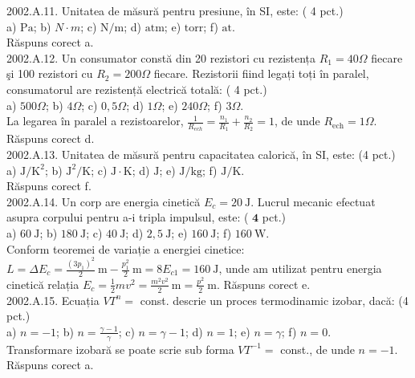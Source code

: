 2002.A.11. Unitatea de măsură pentru presiune, în SI, este: ( 4 pct.)\\ a) $\mathrm{Pa}$; b) $N \cdot m$; c) $\mathrm{N} / \mathrm{m}$; d) $\mathrm{atm}$; e) $\mathrm{torr}$; f) $\mathrm{at}$.\\ Răspuns corect a.\\

2002.A.12. Un consumator constă din 20 rezistori cu rezistența $R_{1}=40 \Omega$ fiecare şi 100 rezistori cu $R_{2}=200 \Omega$ fiecare. Rezistorii fiind legați toți în paralel, consumatorul are rezistență electrică totală: ( 4 pct.)\\ a) $500 \Omega$; b) $4 \Omega$; c) $0,5 \Omega$; d) $1 \Omega$; e) $240 \Omega$; f) $3 \Omega$.\\ La legarea în paralel a rezistoarelor, $\frac{1}{R_{ech}}=\frac{n_{1}}{R_{1}}+\frac{n_{2}}{R_{2}}=1$, de unde $R_{\text {ech}}=1 \Omega$. Răspuns corect d.\\

2002.A.13. Unitatea de măsură pentru capacitatea calorică, în SI, este: (4 pct.)\\ a) $\mathrm{J} / \mathrm{K}^{2}$; b) $\mathrm{J}^{2} / \mathrm{K}$; c) $\mathrm{J} \cdot \mathrm{K}$; d) $\mathrm{J}$; e) $\mathrm{J} / \mathrm{kg}$; f) $\mathrm{J} / \mathrm{K}$.\\ Răspuns corect f.\\

2002.A.14. Un corp are energia cinetică $E_{c}=20 \mathrm{~J}$. Lucrul mecanic efectuat asupra corpului pentru a-i tripla impulsul, este: ( $\mathbf{4}$ pct.)\\ a) $60 \mathrm{~J}$; b) $180 \mathrm{~J}$; c) $40 \mathrm{~J}$; d) $2,5 \mathrm{~J}$; e) $160 \mathrm{~J}$; f) $160 \mathrm{~W}$.\\ Conform teoremei de variație a energiei cinetice:\\ $L=\Delta E_{c}=\frac{\left(3 p_{1}\right)^{2}}{2} \mathrm{~m}-\frac{p_{1}^{2}}{2} \mathrm{~m}=8 E_{c 1}=160 \mathrm{~J}$, unde am utilizat pentru energia cinetică relația $E_{c}=\frac{1}{2} m v^{2}=\frac{m^{2} v^{2}}{2} \mathrm{~m}=\frac{p^{2}}{2} \mathrm{~m}$. Răspuns corect e.\\

2002.A.15. Ecuația $V T^{n}=$ const. descrie un proces termodinamic izobar, dacă: (4 pct.)\\ a) $n=-1$; b) $n=\frac{\gamma-1}{\gamma}$; c) $n=\gamma-1$; d) $n=1$; e) $n=\gamma$; f) $n=0$.\\ Transformare izobară se poate scrie sub forma $V T^{-1}=$ const., de unde $n=-1$. Răspuns corect a.\\

